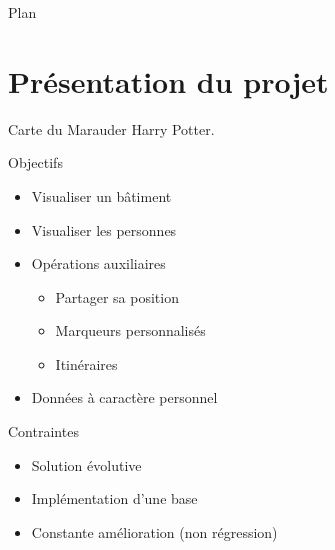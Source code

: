 \documentclass{beamer} %
\begin{document}

  \begin{frame}{Plan}
    \tableofcontents
  \end{frame}


  \section{Présentation du projet}
  \begin{frame}{\secname}
    \begin{center}
      Carte du Marauder Harry Potter.
    \end{center}

    \begin{block}{Objectifs}
      \begin{itemize}
        \item Visualiser un bâtiment
        \item Visualiser les personnes
        \item Opérations auxiliaires
        \begin{itemize}
          \item Partager sa position
          \item Marqueurs personnalisés
          \item Itinéraires
        \end{itemize}
        \item Données à caractère personnel
      \end{itemize}
    \end{block}
    
    \pause

    \begin{alertblock}{Contraintes}
      \begin{itemize}
        \item Solution évolutive
        \item Implémentation d'une base
        \item Constante amélioration (non régression)
      \end{itemize}
    \end{alertblock}
    
  \end{frame}
\end{document}
